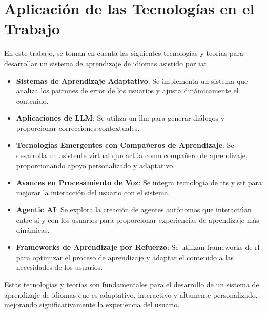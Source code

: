 \section{Aplicación de las Tecnologías en el Trabajo}

En este trabajo, se toman en cuenta las siguientes tecnologías y teorías para desarrollar un sistema de aprendizaje de idiomas asistido por \gls{ia}:

\begin{itemize}
  \item \textbf{Sistemas de Aprendizaje Adaptativo}: Se implementa un sistema que analiza los patrones de error de los usuarios y ajusta dinámicamente el contenido.
  \item \textbf{Aplicaciones de LLM}: Se utiliza un \gls{llm} para generar diálogos y proporcionar correcciones contextuales.
  \item \textbf{Tecnologías Emergentes con Compañeros de Aprendizaje}: Se desarrolla un asistente virtual que actúa como compañero de aprendizaje, proporcionando apoyo personalizado y adaptativo.
  \item \textbf{Avances en Procesamiento de Voz}: Se integra tecnología de \gls{tts} y \gls{stt} para mejorar la interacción del usuario con el sistema.
  \item \textbf{Agentic AI}: Se explora la creación de agentes autónomos que interactúan entre sí y con los usuarios para proporcionar experiencias de aprendizaje más dinámicas.
  \item \textbf{Frameworks de Aprendizaje por Refuerzo}: Se utilizan frameworks de \gls{rl} para optimizar el proceso de aprendizaje y adaptar el contenido a las necesidades de los usuarios.
\end{itemize}

Estas tecnologías y teorías son fundamentales para el desarrollo de un sistema de aprendizaje de idiomas que es adaptativo, interactivo y altamente personalizado, mejorando significativamente la experiencia del usuario.

